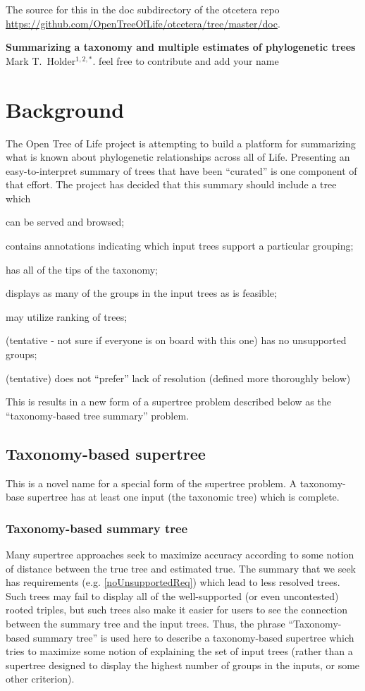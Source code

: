 \documentclass[11pt]{article}
\newcommand{\otol}{Open Tree of Life\xspace}
\begin{document}
The source for this in the doc subdirectory of the otcetera
    repo \url{https://github.com/OpenTreeOfLife/otcetera/tree/master/doc}.
\begin{center}
    {\bf Summarizing a taxonomy and multiple estimates of phylogenetic trees} \\
{Mark T.~Holder$^{1,2,\ast}$. feel free to contribute and add your name}
\end{center}
\tableofcontents
\section{Background}
The \otol project is attempting to build a platform for summarizing what is known
    about phylogenetic relationships across all of Life.
Presenting an easy-to-interpret summary of trees that have been ``curated''
    is one component of that effort.
The project has decided that this summary should include a tree which
\begin{compactenum}
    \item can be served and browsed;
    \item contains annotations indicating which input trees support a particular grouping;
    \item has all of the tips of the taxonomy;
    \item displays as many of the groups in the input trees as is feasible;
    \item may utilize ranking of trees;
    \item (tentative - not sure if everyone is on board with this one) has no unsupported groups;\label{noUnsupportedReq}
    \item (tentative) does not ``prefer'' lack of resolution (defined more thoroughly below)
\end{compactenum}
This is results in a new form of a supertree problem described below as the ``taxonomy-based tree summary'' problem.
\subsection{Taxonomy-based supertree}
This is a novel name for a special form of the supertree problem.
A taxonomy-base supertree has at least one input (the taxonomic tree) which is complete.
\subsubsection{Taxonomy-based summary tree}
Many supertree approaches seek to maximize accuracy according to some notion
    of distance between the true tree and estimated true.
The summary that we seek has requirements (e.g. \ref{noUnsupportedReq})
    which lead to less resolved trees.
Such trees may fail to display all of the well-supported (or even uncontested)
    rooted triples, but such trees also make it easier for users to see the
    connection between the summary tree and the input trees.
Thus, the phrase ``Taxonomy-based summary tree'' is used here to describe a
    taxonomy-based supertree which tries to maximize some notion of
    explaining the set of input trees (rather than a supertree designed to
    display the highest number of groups in the inputs, or some other criterion).
\end{document}
